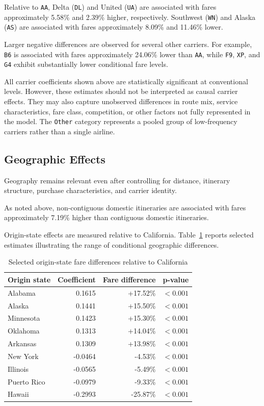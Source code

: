 \documentclass[11pt,a4paper]{article}
\begin{document}
Relative to \texttt{AA}, Delta (\texttt{DL}) and United (\texttt{UA}) are associated with fares approximately 5.58\% and 2.39\% higher, respectively. Southwest (\texttt{WN}) and Alaska (\texttt{AS}) are associated with fares approximately 8.09\% and 11.46\% lower.

Larger negative differences are observed for several other carriers. For example, \texttt{B6} is associated with fares approximately 24.06\% lower than \texttt{AA}, while \texttt{F9}, \texttt{XP}, and \texttt{G4} exhibit substantially lower conditional fare levels.

All carrier coefficients shown above are statistically significant at conventional levels. However, these estimates should not be interpreted as causal carrier effects. They may also capture unobserved differences in route mix, service characteristics, fare class, competition, or other factors not fully represented in the model. The \texttt{Other} category represents a pooled group of low-frequency carriers rather than a single airline.

\subsection{Geographic Effects}

Geography remains relevant even after controlling for distance, itinerary structure, purchase characteristics, and carrier identity.

As noted above, non-contiguous domestic itineraries are associated with fares approximately 7.19\% higher than contiguous domestic itineraries.

Origin-state effects are measured relative to California. Table~\ref{tab:selected-state-effects} reports selected estimates illustrating the range of conditional geographic differences.

\begin{table}[H]
\centering
\caption{Selected origin-state fare differences relative to California}
\label{tab:selected-state-effects}
\begin{tabular}{lrrr}
\toprule
\textbf{Origin state} & \textbf{Coefficient} & \textbf{Fare difference} & \textbf{p-value} \\
\midrule
Alabama & 0.1615 & +17.52\% & $<0.001$ \\
Alaska & 0.1441 & +15.50\% & $<0.001$ \\
Minnesota & 0.1423 & +15.30\% & $<0.001$ \\
Oklahoma & 0.1313 & +14.04\% & $<0.001$ \\
Arkansas & 0.1309 & +13.98\% & $<0.001$ \\
\addlinespace
New York & -0.0464 & -4.53\% & $<0.001$ \\
Illinois & -0.0565 & -5.49\% & $<0.001$ \\
Puerto Rico & -0.0979 & -9.33\% & $<0.001$ \\
Hawaii & -0.2993 & -25.87\% & $<0.001$ \\
\bottomrule
\end{tabular}
\end{table}
\end{document}
